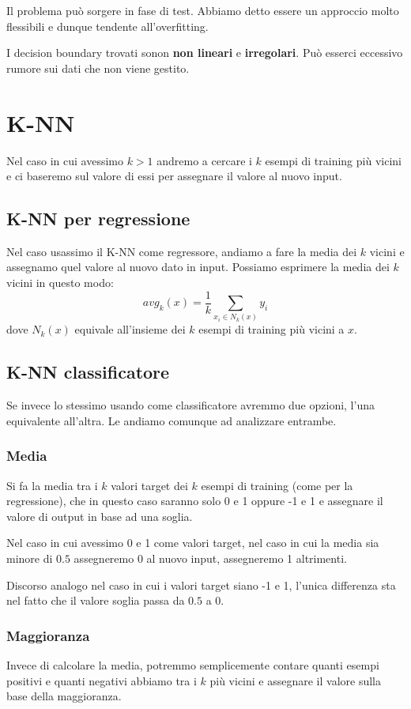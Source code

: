 Il problema pu\`o sorgere in fase di test. Abbiamo detto essere un approccio molto flessibili e dunque tendente
all'overfitting.

I decision boundary trovati sonon \textbf{non lineari} e \textbf{irregolari}. Pu\`o esserci eccessivo rumore sui dati
che non viene gestito.

\section{K-NN}
Nel caso in cui avessimo $k > 1$ andremo a cercare i $k$ esempi di training pi\`u vicini e ci baseremo sul valore di
essi per assegnare il valore al nuovo input.

\subsection*{K-NN per regressione}
Nel caso usassimo il K-NN come regressore, andiamo a fare la media dei $k$ vicini e assegnamo quel valore al nuovo dato
in input. Possiamo esprimere la media dei $k$ vicini in questo modo:
\[ avg_k(x) = \frac{1}{k} \sum_{x_i \in N_k(x)} y_i \]
dove $N_k(x)$ equivale all'insieme dei $k$ esempi di training pi\`u vicini a $x$.

\subsection*{K-NN classificatore}
Se invece lo stessimo usando come classificatore avremmo due opzioni, l'una equivalente all'altra. Le andiamo comunque
ad analizzare entrambe.

\subsubsection{Media}
Si fa la media tra i $k$ valori target dei $k$ esempi di training (come per la regressione), che in questo caso saranno
solo 0 e 1 oppure -1 e 1 e assegnare il valore di output in base ad una soglia.

Nel caso in cui avessimo 0 e 1 come valori target, nel caso in cui la media sia minore di $0.5$ assegneremo 0 al nuovo
input, assegneremo 1 altrimenti.

Discorso analogo nel caso in cui i valori target siano -1 e 1, l'unica differenza sta nel fatto che il valore soglia
passa da $0.5$ a 0.

\subsubsection{Maggioranza}
Invece di calcolare la media, potremmo semplicemente contare quanti esempi positivi e quanti negativi abbiamo tra i $k$
pi\`u vicini e assegnare il valore sulla base della maggioranza.

